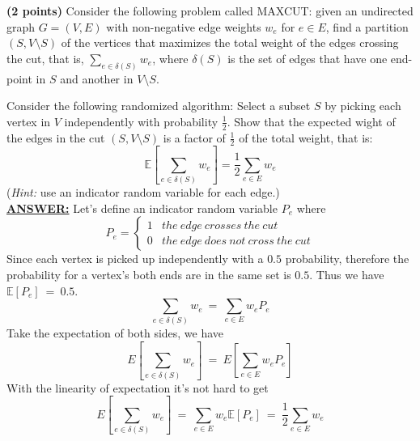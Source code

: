 \documentclass{article}
\begin{document}
\medskip 

\textbf{(2 points)}
Consider the following problem called MAXCUT: given an undirected
graph $G=(V,E)$ with non-negative edge weights $w_e$ for $e\in E$,
find a partition $(S,V\setminus S)$ of the vertices that maximizes the
total weight of the edges crossing the cut, that is,
$\sum_{e\in\delta(S)}w_{e}$, where $\delta(S)$ is the set of edges
that have one end-point in $S$ and another in $V\setminus S$.     

Consider the following randomized algorithm: Select a subset $S$ by
picking each vertex in $V$ independently with probability
$\frac{1}{2}$. Show that the expected wight of the edges in the cut
$(S,V\setminus S)$ is a factor of $\frac{1}{2}$ of the total weight,
that is: $$\mathbb{E}\left[\sum_{e\in\delta(S)}w_{e}\right]=
\frac{1}{2}\sum_{e\in E}w_e$$ ({\it Hint:} use an indicator random
variable for each edge.)\\  
\noindent \underline{\textbf{ANSWER:}}
Let's define an indicator random variable $P_{e}$ where
\begin{equation}
  \label{eq:indicator-random-variable}
  P_{e} = 
  \begin{cases}
    1 & the~edge~crosses~the~cut\\
    0 & the~edge~does~not~cross~the~cut
  \end{cases}
\end{equation}
Since each vertex is picked up independently with a $0.5$ probability,
therefore the probability for a vertex's both ends are in the same set
is $0.5$. Thus we have $\mathbb{E}[P_{e}]~=~0.5$.
$$\sum_{e\in\delta(S)}w_{e}~=~\sum_{e\in E}w_{e}P_{e}$$
Take the expectation of both sides, we have 
$$E[\sum_{e\in\delta(S)}w_{e}]~=~E[\sum_{e\in E}w_{e}P_{e}]$$ 
With the linearity of expectation it's not hard to get
$$E[\sum_{e\in\delta(S)}w_{e}]~=~\sum_{e\in
  E}w_{e}\mathbb{E}[P_{e}]~=~\frac{1}{2}\sum_{e\in E}w_{e}$$ 
\medskip
\end{document}
